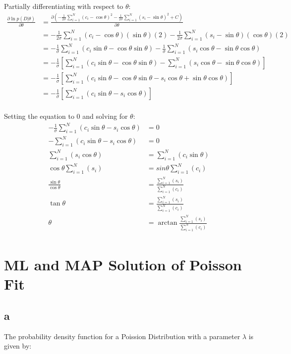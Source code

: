 \documentclass[a4paper]{article}
\begin{document}
Partially differentiating with respect to $\theta$:
\begin{align*}
    \frac{\partial \ln{p(D|\theta)}}{\partial \theta} &= \frac{\partial(-\frac{1}{2\sigma}\sum_{i=1}^{N}(c_i - \cos{\theta})^2 -\frac{1}{2\sigma}\sum_{i=1}^{N}(s_i - \sin{\theta})^2 + C)}{\partial \theta} \\
    &= -\frac{1}{2\sigma}\sum_{i=1}^{N}(c_i - \cos{\theta})(\sin{\theta})(2) -\frac{1}{2\sigma}\sum_{i=1}^{N}(s_i - \sin{\theta})(\cos{\theta})(2) \\
    &= -\frac{1}{\sigma}\sum_{i=1}^{N}(c_i\sin{\theta} - \cos{\theta}\sin{\theta}) -\frac{1}{\sigma}\sum_{i=1}^{N}(s_i\cos{\theta} - \sin{\theta}\cos{\theta}) \\
    &= -\frac{1}{\sigma}\left[\sum_{i=1}^{N}(c_i\sin{\theta} - \cos{\theta}\sin{\theta}) - \sum_{i=1}^{N}(s_i\cos{\theta} - \sin{\theta}\cos{\theta})\right] \\
    &= -\frac{1}{\sigma}\left[\sum_{i=1}^{N}(c_i\sin{\theta} - \cos{\theta}\sin{\theta} - s_i\cos{\theta} + \sin{\theta}\cos{\theta})\right] \\
    &= -\frac{1}{\sigma}\left[\sum_{i=1}^{N}(c_i\sin{\theta} - s_i\cos{\theta})\right] \\
\end{align*}{}

Setting the equation to 0 and solving for $\theta$:
\begin{align*}
     -\frac{1}{\sigma}\sum_{i=1}^{N}(c_i\sin{\theta} - s_i\cos{\theta}) &= 0\\
    -\sum_{i=1}^{N}(c_i\sin{\theta} - s_i\cos{\theta}) &= 0\\
    \sum_{i=1}^{N}(s_i\cos{\theta}) &= \sum_{i=1}^{N}(c_i\sin{\theta}) \\
    \cos{\theta}\sum_{i=1}^{N}(s_i)\ &= sin{\theta}\sum_{i=1}^{N}(c_i)\\
    \frac{\sin{\theta}}{\cos{\theta}} &= \frac{\sum_{i=1}^{N}(s_i)}{\sum_{i=1}^{N}(c_i)}\\
    \tan{\theta} &= \frac{\sum_{i=1}^{N}(s_i)}{\sum_{i=1}^{N}(c_i)}\\
    \theta &= \arctan\frac{\sum_{i=1}^{N}(s_i)}{\sum_{i=1}^{N}(c_i)}\\
\end{align*}{}
\bigskip

\section*{ML and MAP Solution of Poisson Fit}
\subsection*{a}
The probability density function for a Poission Distribution with a parameter $\lambda$ is given by:
\end{document}
